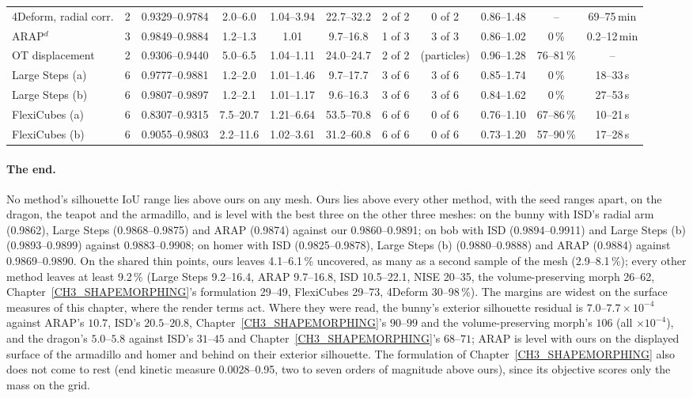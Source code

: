\begin{table}[t]
{\begin{tabular}{lcccccccccc}
4Deform, radial corr. & 2 & 0.9329--0.9784 & 2.0--6.0 & 1.04--3.94 & 22.7--32.2 & 2 of 2 & 0 of 2 & 0.86--1.48 & -- & 69--75\,min \\
ARAP$^d$ & 3 & 0.9849--0.9884 & 1.2--1.3 & 1.01 & 9.7--16.8 & 1 of 3 & 3 of 3 & 0.86--1.02 & 0\,\% & 0.2--12\,min \\
OT displacement & 2 & 0.9306--0.9440 & 5.0--6.5 & 1.04--1.11 & 24.0--24.7 & 2 of 2 & (particles) & 0.96--1.28 & 76--81\,\% & -- \\
Large Steps (a) & 6 & 0.9777--0.9881 & 1.2--2.0 & 1.01--1.46 & 9.7--17.7 & 3 of 6 & 3 of 6 & 0.85--1.74 & 0\,\% & 18--33\,s \\
Large Steps (b) & 6 & 0.9807--0.9897 & 1.2--2.1 & 1.01--1.17 & 9.6--16.3 & 3 of 6 & 3 of 6 & 0.84--1.62 & 0\,\% & 27--53\,s \\
FlexiCubes (a) & 6 & 0.8307--0.9315 & 7.5--20.7 & 1.21--6.64 & 53.5--70.8 & 6 of 6 & 0 of 6 & 0.76--1.10 & 67--86\,\% & 10--21\,s \\
FlexiCubes (b) & 6 & 0.9055--0.9803 & 2.2--11.6 & 1.02--3.61 & 31.2--60.8 & 6 of 6 & 0 of 6 & 0.73--1.20 & 57--90\,\% & 17--28\,s \\
\bottomrule
\end{tabular}}
\end{table}

\paragraph{The end.} No method's silhouette IoU range lies above ours on any mesh. Ours lies above every other method,
with the seed ranges apart, on the dragon, the teapot and the armadillo, and is level with the best three on the other
three meshes: on the bunny with ISD's radial arm (0.9862), Large Steps (0.9868--0.9875) and ARAP (0.9874) against our
0.9860--0.9891; on bob with ISD (0.9894--0.9911) and Large Steps (b) (0.9893--0.9899) against 0.9883--0.9908; on homer
with ISD (0.9825--0.9878), Large Steps (b) (0.9880--0.9888) and ARAP (0.9884) against 0.9869--0.9890. On the shared thin
points, ours leaves 4.1--6.1\,\% uncovered, as many as a second sample of the mesh (2.9--8.1\,\%); every other method
leaves at least 9.2\,\% (Large Steps 9.2--16.4, ARAP 9.7--16.8, ISD 10.5--22.1, NISE 20--35, the volume-preserving morph
26--62, Chapter~\ref{CH3_SHAPEMORPHING}'s formulation 29--49, FlexiCubes 29--73, 4Deform 30--98\,\%). The margins are
widest on the surface measures of this chapter, where the render terms act. Where they were read, the bunny's exterior
silhouette residual is $7.0$--$7.7\times10^{-4}$ against ARAP's $10.7$, ISD's $20.5$--$20.8$,
Chapter~\ref{CH3_SHAPEMORPHING}'s $90$--$99$ and the volume-preserving morph's $106$ (all $\times10^{-4}$), and the dragon's
$5.0$--$5.8$ against ISD's $31$--$45$ and Chapter~\ref{CH3_SHAPEMORPHING}'s $68$--$71$; ARAP is level with ours on the
displayed surface of the armadillo and homer and behind on their exterior silhouette. The formulation of
Chapter~\ref{CH3_SHAPEMORPHING} also does not come to rest (end kinetic measure 0.0028--0.95, two to seven orders of
magnitude above ours), since its objective scores only the mass on the grid.

